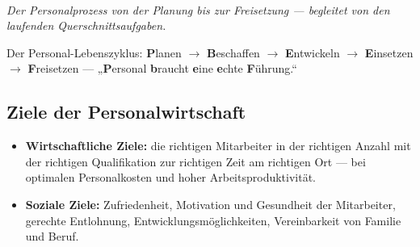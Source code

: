 \documentclass[11pt, a4paper]{article}
\begin{document}
\begin{center}
\\[0.3em]
{\small\itshape Der Personalprozess von der Planung bis zur Freisetzung --- begleitet
von den laufenden Querschnittsaufgaben.}
\end{center}

\begin{eselsbruecke}
Der Personal-Lebenszyklus: \textbf{P}lanen $\rightarrow$ \textbf{B}eschaffen $\rightarrow$
\textbf{E}ntwickeln $\rightarrow$ \textbf{E}insetzen $\rightarrow$ \textbf{F}reisetzen ---
„\textbf{P}ersonal \textbf{b}raucht \textbf{e}ine \textbf{e}chte \textbf{F}ührung.``
\end{eselsbruecke}

\subsection{Ziele der Personalwirtschaft}

\begin{itemize}
  \item \textbf{Wirtschaftliche Ziele:} die richtigen Mitarbeiter in der richtigen Anzahl
    mit der richtigen Qualifikation zur richtigen Zeit am richtigen Ort --- bei optimalen
    Personalkosten und hoher Arbeitsproduktivität.
  \item \textbf{Soziale Ziele:} Zufriedenheit, Motivation und Gesundheit der Mitarbeiter,
    gerechte Entlohnung, Entwicklungsmöglichkeiten, Vereinbarkeit von Familie und Beruf.
\end{itemize}
\end{document}
